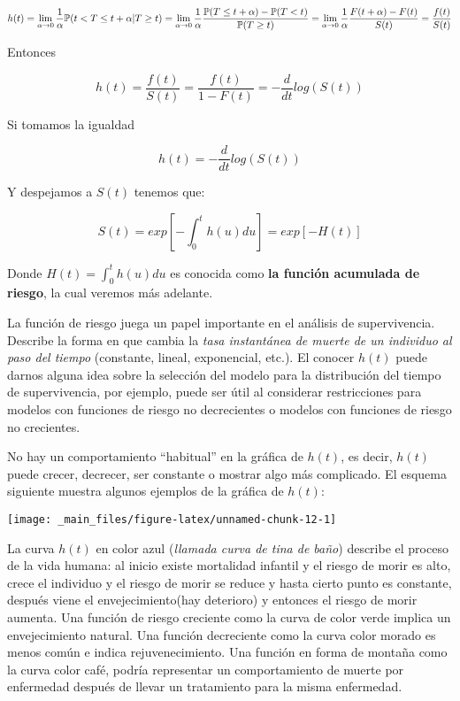 \documentclass[
  a4paper,
  oneside,
  openany]{book}
\begin{document}
\[
h(t)=\lim_{\alpha\rightarrow 0}\frac{1}{\alpha}\mathbb{P}(t<T\leq t+\alpha|T\geq t)
\\
=\lim_{\alpha\rightarrow 0}\frac{1}{\alpha}\frac{\mathbb{P}(T\leq t+\alpha)-\mathbb{P}(T<t)}{\mathbb{P}(T\geq t)}\\
=\lim_{\alpha\rightarrow 0}\frac{1}{\alpha}\frac{F(t+\alpha)-F(t)}{S(t)}
=\frac{f(t)}{S(t)}
\]

Entonces

\[
h(t)=\frac{f(t)}{S(t)}=\frac{f(t)}{1-F(t)}=-\frac{d}{dt}log(S(t))
\]

Si tomamos la igualdad

\[
h(t)=-\frac{d}{dt}log(S(t))
\]

Y despejamos a \(S(t)\) tenemos que:

\[
S(t)=exp\left[-\int_{0}^{t}h(u)du\right]=exp[-H(t)]
\]

Donde \(H(t)=\int_{0}^{t}h(u)du\) es conocida como \textbf{la función acumulada de riesgo}, la cual veremos más adelante.

La función de riesgo juega un papel importante en el análisis de supervivencia. Describe la forma en que cambia la \emph{tasa instantánea de muerte de un individuo al paso del tiempo} (constante, lineal, exponencial, etc.). El conocer \(h(t)\) puede darnos alguna idea sobre la selección del modelo para la distribución del tiempo de supervivencia, por ejemplo, puede ser útil al considerar restricciones para modelos con funciones de riesgo no decrecientes o modelos con funciones de riesgo no crecientes.

No hay un comportamiento ``habitual'' en la gráfica de \(h(t)\), es decir, \(h(t)\) puede crecer, decrecer, ser constante o mostrar algo más complicado. El esquema siguiente muestra algunos ejemplos de la gráfica de \(h(t)\):

\begin{center}\texttt{[image: \_main\_files/figure-latex/unnamed-chunk-12-1]} \end{center}

La curva \(h(t)\) en color azul (\emph{llamada curva de tina de baño}) describe el proceso de la vida humana: al inicio existe mortalidad infantil y el riesgo de morir es alto, crece el individuo y el riesgo de morir se reduce y hasta cierto punto es constante, después viene el envejecimiento(hay deterioro) y entonces el riesgo de morir aumenta. Una función de riesgo creciente como la curva de color verde implica un envejecimiento natural. Una función decreciente como la curva color morado es menos común e indica rejuvenecimiento. Una función en forma de montaña como la curva color café, podría representar un comportamiento de muerte por enfermedad después de llevar un tratamiento para la misma enfermedad.
\end{document}
